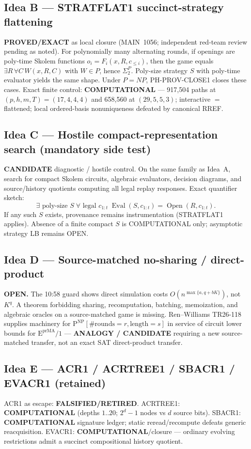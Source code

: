 \documentclass[11pt]{article}
\begin{document}
\subsection*{Idea B --- STRATFLAT1 succinct-strategy flattening}
\textbf{PROVED/EXACT} as local closure (MAIN~1056; independent red-team review pending as noted).
For polynomially many alternating rounds, if openings are poly-time Skolem functions
$o_i=F_i(x,R,c_{\le i})$, then the game equals $\exists R\,\forall C\,W(x,R,C)$ with $W\in P$,
hence $\Sigma_2^P$. Poly-size strategy $S$ with poly-time evaluator yields the same shape.
Under $P=NP$, PH-PROV-CLOSE1 closes these cases. Exact finite control:
\textbf{COMPUTATIONAL} --- 917{,}504 paths at $(p,h,m,T)=(17,4,4,4)$ and 658{,}560 at
$(29,5,5,3)$; interactive $=$ flattened; local ordered-basis nonuniqueness defeated by canonical RREF.

\subsection*{Idea C --- Hostile compact-representation search (mandatory side test)}
\textbf{CANDIDATE} diagnostic / hostile control. On the same family as Idea~A, search for
compact Skolem circuits, algebraic evaluators, decision diagrams, and source/history quotients
computing all legal replay responses. Exact quantifier sketch:
\[
\exists\text{ poly-size }S\;\forall\text{ legal }c_{1:t}\;
\operatorname{Eval}(S,c_{1:t})=\operatorname{Open}(R,c_{1:t}).
\]
If any such $S$ exists, provenance remains instrumentation (STRATFLAT1 applies). Absence of a
finite compact $S$ is COMPUTATIONAL only; asymptotic strategy LB remains OPEN.

\subsection*{Idea D --- Source-matched no-sharing / direct-product}
\textbf{OPEN.} The 10:58 guard shows direct simulation costs $O(n^{\max\{a,q+bK\}})$, not
$K^q$. A theorem forbidding sharing, recomputation, batching, memoization, and algebraic oracles
on a source-matched game is missing. Ren--Williams TR26-118 supplies machinery for
$\mathrm{P}^{\mathrm{NP}}[\#\mathrm{rounds}=r,\mathrm{length}=s]$ in service of circuit lower
bounds for $\mathrm{E}^{\mathrm{prMA}}/1$ --- \textbf{ANALOGY / CANDIDATE} requiring a new
source-matched transfer, not an exact SAT direct-product transfer.

\subsection*{Idea E --- ACR1 / ACRTREE1 / SBACR1 / EVACR1 (retained)}
ACR1 as escape: \textbf{FALSIFIED/RETIRED}.
ACRTREE1: \textbf{COMPUTATIONAL} (depths $1..20$; $2^d-1$ nodes vs $d$ source bits).
SBACR1: \textbf{COMPUTATIONAL} signature ledger; static reread/recompute defeats generic
reacquisition.
EVACR1: \textbf{COMPUTATIONAL}/closure --- ordinary evolving restrictions admit a succinct
compositional history quotient.
\end{document}
